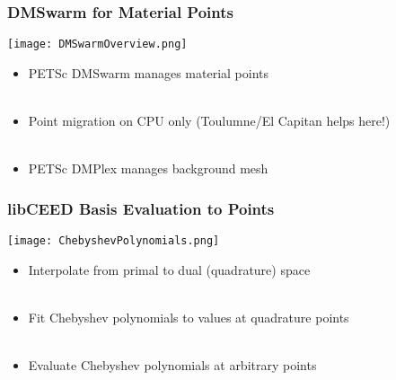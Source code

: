 \documentclass{beamer}
\begin{document}

\begin{frame}
\begin{center}
\frametitle{DMSwarm for Material Points}

\begin{center}
\texttt{[image: DMSwarmOverview.png]}
\end{center}

\begin{itemize}

\item PETSc DMSwarm manages material points\\

~\\

\item Point migration on CPU only (Toulumne/El Capitan helps here!)\\

~\\

\item PETSc DMPlex manages background mesh\\

\end{itemize}

\end{center}
\end{frame}


\begin{frame}
\begin{center}
\frametitle{libCEED Basis Evaluation to Points}

\begin{center}
\texttt{[image: ChebyshevPolynomials.png]}
\end{center}

\begin{itemize}

\item Interpolate from primal to dual (quadrature) space\\

~\\

\item Fit Chebyshev polynomials to values at quadrature points\\

~\\

\item Evaluate Chebyshev polynomials at arbitrary points\\

\end{itemize}

\end{center}
\end{frame}
\end{document}
